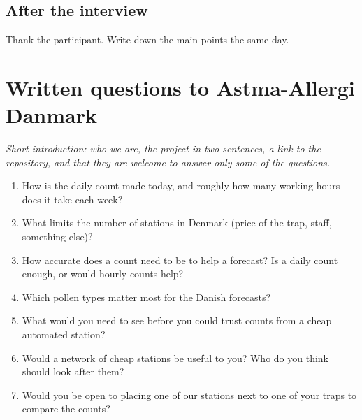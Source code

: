 \section*{After the interview}
Thank the participant. Write down the main points the same day.

\chapter{Written questions to Astma-Allergi Danmark}\label{app:expert-questions}


\textit{Short introduction: who we are, the project in two sentences, a link to the repository,
and that they are welcome to answer only some of the questions.}

\begin{enumerate}
  \item How is the daily count made today, and roughly how many working hours does it take each
  week?
  \item What limits the number of stations in Denmark (price of the trap, staff, something
  else)?
  \item How accurate does a count need to be to help a forecast? Is a daily count enough, or
  would hourly counts help?
  \item Which pollen types matter most for the Danish forecasts?
  \item What would you need to see before you could trust counts from a cheap automated station?
  \item Would a network of cheap stations be useful to you? Who do you think should look after
  them?
  \item Would you be open to placing one of our stations next to one of your traps to compare the
  counts?
\end{enumerate}
